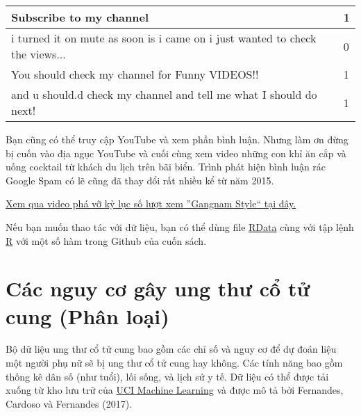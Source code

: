 \begin{table}[]
\begin{tabular}{|l|l|}
Subscribe to my channel                                                                                                                                                                                            & 1     \\ \hline
i turned it on mute as soon is i came on i just wanted to check the views...                                                                                                                                       & 0     \\ \hline
You should check my channel for Funny VIDEOS!!                                                                                                                                                                     & 1     \\ \hline
and u should.d check my channel and tell me what I should do next!                                                                                                                                                 & 1     \\ \hline
\end{tabular}
\end{table}

Bạn cũng có thể truy cập YouTube và xem phần bình luận. Nhưng làm ơn đừng bị cuốn vào địa ngục YouTube và cuối cùng xem video những con khỉ ăn cắp và uống cocktail từ khách du lịch trên bãi biển. Trình phát hiện bình luận rác Google Spam có lẽ cũng đã thay đổi rất nhiều kể từ năm 2015.

\href{https://www.youtube.com/watch?v=9bZkp7q19f0&feature=player_embedded}{Xem qua video phá vỡ kỷ lục số lượt xem ''Gangnam Style`` tại đây.}

Nếu bạn muốn thao tác với dữ liệu, bạn có thể dùng file \href{https://github.com/christophM/interpretable-ml-book/blob/master/data/ycomments.RData}{RData} cùng với tập lệnh \href{https://github.com/christophM/interpretable-ml-book/blob/master/R/get-SpamTube-dataset.R}{R} với một số hàm trong Github của cuốn sách.

\section{Các nguy cơ gây ung thư cổ tử cung (Phân loại)} \label{chap_3.3}
Bộ dữ liệu ung thư cổ tử cung bao gồm các chỉ số và nguy cơ để dự đoán liệu một người phụ nữ sẽ bị ung thư cổ tử cung hay không. Các tính năng bao gồm thống kê dân số (như tuổi), lối sống, và lịch sử y tế. Dữ liệu có thể được tải xuống từ kho lưu trữ của \href{https://archive.ics.uci.edu/ml/datasets/Cervical+cancer+\%28Risk+Factors\%29}{UCI Machine Learning} và được mô tả bởi Fernandes, Cardoso và Fernandes (2017).

